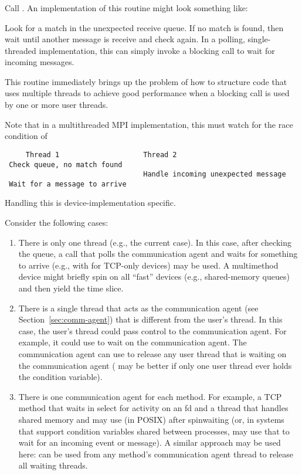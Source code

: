 \documentclass{article}
\begin{document}
\subsubsection{}

Call .  
An implementation of this routine might look something like:

\begin{mmadi}
Look for a match in the unexpected receive queue. 
If no match is found, then wait until another message is receive and check
again.  In a polling, single-threaded implementation, this can simply invoke a
blocking call to wait for incoming messages. 

This routine immediately brings up the problem of how to structure code that
uses multiple threads to achieve good performance when a blocking call is used
by one or more user threads.

Note that in a multithreaded MPI implementation, this must watch for the race
condition of
\begin{verbatim}
     Thread 1                    Thread 2
 Check queue, no match found
                                 Handle incoming unexpected message
 Wait for a message to arrive
\end{verbatim}
Handling this is device-implementation specific.

Consider the following cases:
\begin{enumerate}
\item There is only one thread (e.g., the current  case).  In this
  case, after checking the queue, a call that polls the communication agent
  and waits for something to arrive (e.g., with  for TCP-only
  devices) may be used.  A multimethod device might briefly spin on all
  ``fast'' devices (e.g., shared-memory queues) and then yield the time slice.
\item There is a single thread that acts as the communication agent (see
  Section~\ref{sec:comm-agent}) that is different from the user's thread.
  In this case, the user's thread could pass control to the communication
  agent.  For example, it could use  to wait on the
  communication agent.  The communication agent can use
   to release any user thread that is waiting on
  the communication agent ( may be better if only
  one user thread ever holds the condition variable).
\item There is one communication agent for each method.  For example,
  a TCP method that waits in select for activity on an fd and a thread that
  handles shared memory and may use (in POSIX)  after
  spinwaiting (or, in systems that support condition variables shared between
  processes, may use that to wait for an incoming event or message).
  A similar approach may be used here:  can be
  used from any method's communication agent thread to release all waiting
  threads. 
\end{enumerate}


\end{mmadi}
\end{document}
